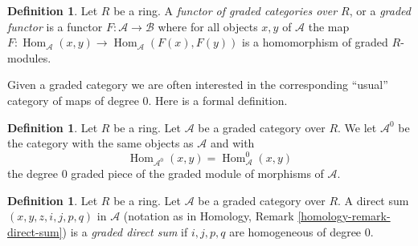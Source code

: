 \documentclass{stacks-project}
\theoremstyle{plain}
\theoremstyle{definition}
\newtheorem{definition}[subsection]{Definition}
\theoremstyle{remark}
\numberwithin{equation}{subsection}
\def\Hom{\mathop{\mathrm{Hom}}\nolimits}
\begin{document}
\begin{definition}
\label{definition-functor-graded-categories}
Let $R$ be a ring. A {\it functor of graded categories over $R$}, or a
{\it graded functor}
is a functor $F : \mathcal{A} \to \mathcal{B}$ where for all objects
$x, y$ of $\mathcal{A}$ the map
$F : \Hom_\mathcal{A}(x, y) \to \Hom_\mathcal{A}(F(x), F(y))$
is a homomorphism of graded $R$-modules.
\end{definition}

\noindent
Given a graded category we are often interested in the
corresponding ``usual'' category of maps of degree $0$.
Here is a formal definition.

\begin{definition}
\label{definition-H0-of-graded-category}
Let $R$ be a ring. Let $\mathcal{A}$ be a graded category
over $R$. We let {\it $\mathcal{A}^0$} be the category with the
same objects as $\mathcal{A}$ and with
$$
\Hom_{\mathcal{A}^0}(x, y) = \Hom^0_\mathcal{A}(x, y)
$$
the degree $0$ graded piece of the graded module of morphisms of
$\mathcal{A}$.
\end{definition}

\begin{definition}
\label{definition-graded-direct-sum}
Let $R$ be a ring. Let $\mathcal{A}$ be a graded category over $R$.
A direct sum $(x, y, z, i, j, p, q)$ in $\mathcal{A}$ (notation as in
Homology, Remark \ref{homology-remark-direct-sum})
is a {\it graded direct sum} if $i, j, p, q$ are homogeneous
of degree $0$.
\end{definition}
\end{document}
